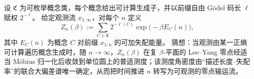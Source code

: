 

\begin{conjecture}\label{conj:xi-godel-weighted-leyang-universal-circle-law}
设 \(\mathfrak C\) 为可枚举概念类，每个概念给出可计算生成子，并以前缀自由 Gödel 码长 \(\ell\) 赋权 \(2^{-\ell}\)。
给定观测流 \(x_{1:\infty}\)，对每个 \(n\) 定义
\[
Z_n(\beta):=
\sum_{C\in\mathfrak C}
2^{-\ell(C)}\exp\!\bigl(-\beta E_C(n)\bigr),
\]
其中 \(E_C(n)\) 为概念 \(C\) 对前缀 \(x_{1:n}\) 的可加失配能量。
猜想：当观测由某一正熵可计算遍历概念生成时，随 \(n\to\infty\)，\(Z_n(\beta)\) 在复 \(\beta\)-平面的 Lee--Yang 零点经适当 Möbius 归一化后收敛到单位圆上的普适测度；该测度角密度由“描述长度--失配率”的联合大偏差谱唯一确定，从而把时间推进 \(n\) 转写为可观测的零点输运流。
\end{conjecture}
